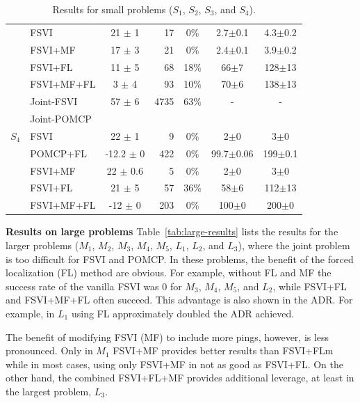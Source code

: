\documentclass[letterpaper]{article} %
\newcommand{\itay}[1]{}
\begin{document}
\begin{table}
{\begin{tabular}{ |c|l|c|r|c|c|c| }
    & FSVI\itay{+} & 21 $\pm$ 1 & 17 & 0\% & 2.7$\pm$0.1 & 4.3$\pm$0.2 \\
    & FSVI+MF\itay{+} & 17 $\pm$ 3 & 21 & 0\% & 2.4$\pm$0.1 & 3.9$\pm$0.2 \\
    &FSVI+FL\itay{+} & 11 $\pm$ 5 & 68 & 18\% & 66$\pm$7 & 128$\pm$13 \\
    & FSVI+MF+FL\itay{+} & 3 $\pm$ 4 & 93 & 10\% & 70$\pm$6 & 138$\pm$13 \\
    \hline
    \hline
    \multirow{5}{*}{$S_4$} 
    & Joint-FSVI\itay{+} & 57 $\pm$ 6 & 4735 & 63\% &  - & - \\ 
    & Joint-POMCP &&&&& \\
    & FSVI\itay{+} & 22 $\pm$ 1 & 9 & 0\% & 2$\pm$0 & 3$\pm$0 \\
    & POMCP+FL\itay{+} & -12.2 $\pm$ 0 & 422 & 0\% & 99.7$\pm$0.06 & 199$\pm$0.1 \\
    & FSVI+MF\itay{+} & 22 $\pm$ 0.6 & 5 & 0\% &  2$\pm$0 & 3$\pm$0 \\
    &FSVI+FL\itay{+} & 21 $\pm$ 5 & 57 & 36\% & 58$\pm$6 & 112$\pm$13 \\
    & FSVI+MF+FL\itay{+} & -12 $\pm$ 0 & 203 & 0\% &  100$\pm$0 & 200$\pm$0 \\
    \hline
    \hline
     \end{tabular}
     }
    \caption{Results for small problems ($S_1$, $S_2$, $S_3$, and $S_4$).\itay{** Average run-time in 200 runs}}
    \label{tab:2small-results}
    \vspace{-0.3cm}
\end{table}




\noindent\textbf{Results on large problems}
Table~\ref{tab:large-results} lists the results for the larger problems ($M_1$, $M_2$, $M_3$, $M_4$, $M_5$, $L_1$, $L_2$, and $L_3$), where the joint problem is too difficult for FSVI and POMCP. 
In these problems, the benefit of the forced localization (FL) method are obvious. 
For example, without FL and MF the success rate of the vanilla FSVI was 0 for $M_3$, $M_4$, $M_5$, and $L_2$, while 
FSVI+FL and FSVI+MF+FL often succeed. This advantage is also shown in the ADR. 
For example, in $L_1$ using FL approximately doubled the ADR achieved. 


The benefit of modifying FSVI (MF) to include more pings, however, is less pronounced. Only in $M_1$ FSVI+MF provides better results than FSVI+FLm while in most cases, using only FSVI+MF in not as good as FSVI+FL. On the other hand, the combined FSVI+FL+MF provides additional leverage, at least in the largest problem, $L_3$.
\end{document}
